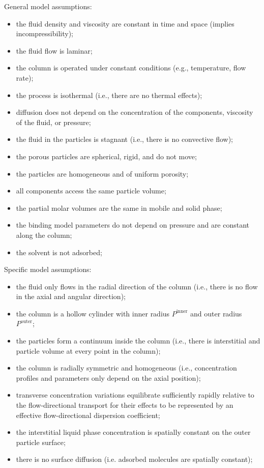 \documentclass{article}
\begin{document}
General model assumptions:
\begin{itemize}
    \item the fluid density and viscosity are constant in time and space (implies incompressibility);
    \item the fluid flow is laminar;
    \item the column is operated under constant conditions (e.g., temperature, flow rate);
    \item the process is isothermal (i.e., there are no thermal effects);
    \item diffusion does not depend on the concentration of the components, viscosity of the fluid, or pressure;
    \item the fluid in the particles is stagnant (i.e., there is no convective flow);
    \item the porous particles are spherical, rigid, and do not move;
    \item the particles are homogeneous and of uniform porosity;
    \item all components access the same particle volume;
    \item the partial molar volumes are the same in mobile and solid phase;
    \item the binding model parameters do not depend on pressure and are constant along the column;
    \item the solvent is not adsorbed;
\end{itemize}

Specific model assumptions:
\begin{itemize}
    \item the fluid only flows in the radial direction of the column (i.e., there is no flow in the axial and angular direction);
    \item the column is a hollow cylinder with inner radius $P^{\mathrm{inner}}$ and outer radius $P^{\mathrm{outer}}$;
    \item the particles form a continuum inside the column (i.e., there is interstitial and particle volume at every point in the column);
    \item the column is radially symmetric and homogeneous (i.e., concentration profiles and parameters only depend on the axial position);
    \item transverse concentration variations equilibrate sufficiently rapidly relative to the flow-directional transport for their effects to be represented by an effective flow-directional dispersion coefficient;
    \item the interstitial liquid phase concentration is spatially constant on the outer particle surface;
    \item there is no surface diffusion (i.e. adsorbed molecules are spatially constant);
\end{itemize}
\end{document}

